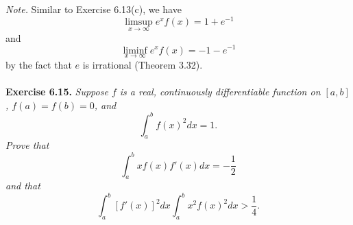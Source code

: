 \documentclass{article}
\begin{document}
\emph{Note.}
Similar to Exercise 6.13(c), we have
\[
  \limsup_{x \to \infty} e^x f(x) = 1 + e^{-1}
\]
and
\[
  \liminf_{x \to \infty} e^x f(x) = -1-e^{-1}
\]
by the fact that $e$ is irrational (Theorem 3.32). \\\\






\textbf{Exercise 6.15.}
\emph{Suppose $f$ is a real, continuously differentiable function on $[a,b]$,
$f(a)=f(b)=0$, and
\[
  \int_{a}^{b} f(x)^2 dx = 1.
\]
Prove that
\[
  \int_{a}^{b} xf(x)f'(x) dx = -\frac{1}{2}
\]
and that
\[
  \int_{a}^{b} [f'(x)]^2 dx \int_{a}^{b} x^2f(x)^2 dx > \frac{1}{4}.
\]
} \\
\end{document}
